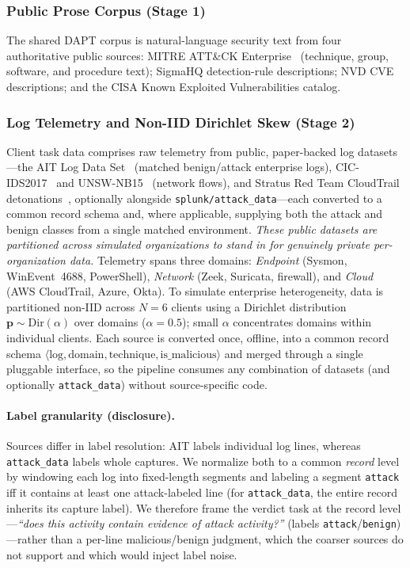 \documentclass[11pt,a4paper]{article}
\begin{document}
\subsubsection{Public Prose Corpus (Stage 1)}
The shared DAPT corpus is natural-language security text from four authoritative public sources: MITRE ATT\&CK Enterprise~\cite{strom2018attack} (technique, group, software, and procedure text); SigmaHQ detection-rule descriptions; NVD CVE descriptions; and the CISA Known Exploited Vulnerabilities catalog.

\subsubsection{Log Telemetry and Non-IID Dirichlet Skew (Stage 2)}
Client task data comprises raw telemetry from public, paper-backed log datasets---the AIT Log Data Set~\cite{landauer2022ait} (matched benign/attack enterprise logs), CIC-IDS2017~\cite{sharafaldin2017cicids} and UNSW-NB15~\cite{moustafa2015unsw} (network flows), and Stratus Red Team CloudTrail detonations~\cite{stratus2023}, optionally alongside \texttt{splunk/attack\_data}---each converted to a common record schema and, where applicable, supplying both the attack and benign classes from a single matched environment. \emph{These public datasets are partitioned across simulated organizations to stand in for genuinely private per-organization data.} Telemetry spans three domains: \emph{Endpoint} (Sysmon, WinEvent~4688, PowerShell), \emph{Network} (Zeek, Suricata, firewall), and \emph{Cloud} (AWS CloudTrail, Azure, Okta). To simulate enterprise heterogeneity, data is partitioned non-IID across $N{=}6$ clients using a Dirichlet distribution $\boldsymbol{p}\sim\mathrm{Dir}(\alpha)$ over domains ($\alpha{=}0.5$); small $\alpha$ concentrates domains within individual clients. Each source is converted once, offline, into a common record schema $\langle\text{log},\text{domain},\text{technique},\text{is\_malicious}\rangle$ and merged through a single pluggable interface, so the pipeline consumes any combination of datasets (and optionally \texttt{attack\_data}) without source-specific code.

\paragraph{Label granularity (disclosure).} Sources differ in label resolution: AIT labels individual log lines, whereas \texttt{attack\_data} labels whole captures. We normalize both to a common \emph{record} level by windowing each log into fixed-length segments and labeling a segment \texttt{attack} iff it contains at least one attack-labeled line (for \texttt{attack\_data}, the entire record inherits its capture label). We therefore frame the verdict task at the record level---\emph{``does this activity contain evidence of attack activity?''} (labels \texttt{attack}/\texttt{benign})---rather than a per-line malicious/benign judgment, which the coarser sources do not support and which would inject label noise.
\end{document}
